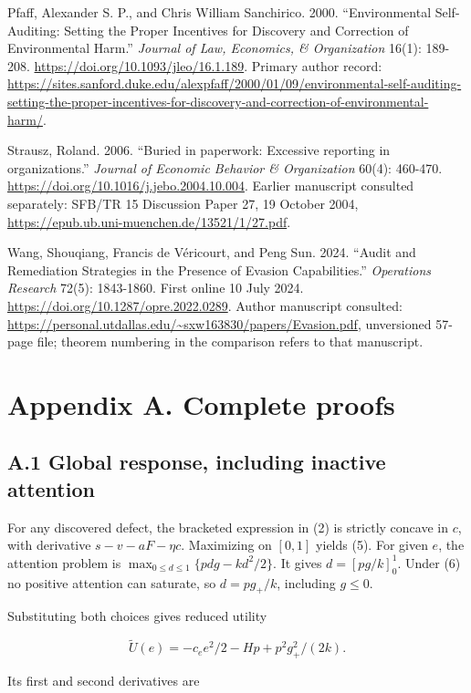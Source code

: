 \documentclass[
  11pt,
]{article}
\begin{document}
{Pfaff, Alexander S. P., and Chris William Sanchirico. 2000.
``Environmental Self-Auditing: Setting the Proper Incentives for
Discovery and Correction of Environmental Harm.'' \emph{Journal of Law,
Economics, \& Organization} 16(1): 189-208.
\url{https://doi.org/10.1093/jleo/16.1.189}. Primary author record:
\url{https://sites.sanford.duke.edu/alexpfaff/2000/01/09/environmental-self-auditing-setting-the-proper-incentives-for-discovery-and-correction-of-environmental-harm/}.

Strausz, Roland. 2006. ``Buried in paperwork: Excessive reporting in
organizations.'' \emph{Journal of Economic Behavior \& Organization}
60(4): 460-470. \url{https://doi.org/10.1016/j.jebo.2004.10.004}.
Earlier manuscript consulted separately: SFB/TR 15 Discussion Paper 27,
19 October 2004, \url{https://epub.ub.uni-muenchen.de/13521/1/27.pdf}.

Wang, Shouqiang, Francis de Véricourt, and Peng Sun. 2024. ``Audit and
Remediation Strategies in the Presence of Evasion Capabilities.''
\emph{Operations Research} 72(5): 1843-1860. First online 10 July 2024.
\url{https://doi.org/10.1287/opre.2022.0289}. Author manuscript
consulted:
\url{https://personal.utdallas.edu/~sxw163830/papers/Evasion.pdf},
unversioned 57-page file; theorem numbering in the comparison refers to
that manuscript.

}
\clearpage
\section{Appendix A. Complete
proofs}\label{appendix-a.-complete-proofs}

\subsection{A.1 Global response, including inactive
attention}\label{a.1-global-response-including-inactive-attention}

For any discovered defect, the bracketed expression in (2) is strictly
concave in \(c\), with derivative \(s-v-aF-\eta c\). Maximizing on
\([0,1]\) yields (5). For given \(e\), the attention problem is
\(\max_{0\leq d\leq1}\{pdg-kd^2/2\}\). It gives \(d=[pg/k]_0^1\). Under
(6) no positive attention can saturate, so \(d=pg_+/k\), including
\(g\leq0\).

Substituting both choices gives reduced utility

\[\widetilde U(e)=-c_e e^2/2-Hp+p^2g_+^2/(2k).\]

Its first and second derivatives are
\end{document}
